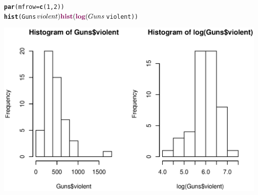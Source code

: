 \documentclass{article}\usepackage{graphicx, color}
\makeatletter
\newcommand{\hlfunctioncall}[1]{\textcolor[rgb]{0.501960784313725,0,0.329411764705882}{\textbf{#1}}}%
\newenvironment{kframe}{%
 \def\at@end@of@kframe{}%
 \ifinner\ifhmode%
  \def\at@end@of@kframe{\end{minipage}}%
  \begin{minipage}{\columnwidth}%
 \fi\fi%
 \def\FrameCommand##1{\hskip\@totalleftmargin \hskip-\fboxsep
 \colorbox{shadecolor}{##1}\hskip-\fboxsep
     \hskip-\linewidth \hskip-\@totalleftmargin \hskip\columnwidth}%
 \MakeFramed {\advance\hsize-\width
   \@totalleftmargin\z@ \linewidth\hsize
   \@setminipage}}%
 {\par\unskip\endMakeFramed%
 \at@end@of@kframe}
\newenvironment{knitrout}{}{} %
\makeatother
\begin{document}
\begin{knitrout}
\color{fgcolor}\begin{kframe}
\begin{alltt}
\hlfunctioncall{par}(mfrow=\hlfunctioncall{c}(1,2))
\hlfunctioncall{hist}(Guns$violent)
\hlfunctioncall{hist}(\hlfunctioncall{log}(Guns$violent))
\end{alltt}
\end{kframe}

{\centering \includegraphics[width=\linewidth]{plots/unnamed-chunk-15} 

}


\end{knitrout}
\end{document}
